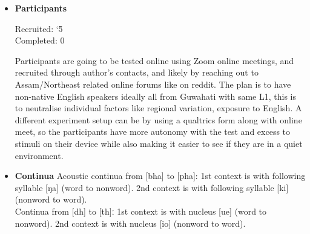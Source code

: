 \documentclass[12pt, english]{article}
\begin{document}
\begin{itemize}
    \item \textbf{Participants} \par
    Recruited: \char`\~ 5 \\
    Completed: 0 \par
    Participants are going to be tested online using Zoom online meetings, and recruited through author's contacts, and likely by reaching out to Assam/Northeast related online forums like on reddit. The plan is to have non-native English speakers ideally all from Guwahati with same L1, this is to neutralise individual factors like regional variation, exposure to English. A different experiment setup can be by using a qualtrics form along with online meet, so the participants have more autonomy with the test and excess to stimuli on their device while also making it easier to see if they are in a quiet environment. \par
    \item \textbf{Continua}
    Acoustic continua from [bha] to [pha]: 1st context is with following syllable [ŋa] (word to nonword). 2nd context is with following syllable [ki] (nonword to word). \\
    Continua from [dh] to [th]ː 1st context is with nucleus [ue] (word to nonword). 2nd context is with nucleus [io] (nonword to word). \par
\end{itemize}

\end{document}
